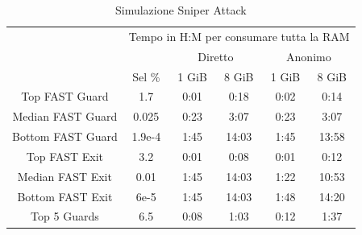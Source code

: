 \begin{table}[]
\centering
\caption{Simulazione Sniper Attack}
\label{Tab:sniperattack}
\begin{tabular}{cccccc}
\multicolumn{1}{l}{}                    & \multicolumn{5}{c}{Tempo in H:M per consumare tutta la RAM}                                                                                       \\ \cline{3-6} 
                                        & \multicolumn{1}{c|}{}       & \multicolumn{2}{c|}{Diretto}                              & \multicolumn{2}{c|}{Anonimo}                           \\ \cline{2-6} 
\multicolumn{1}{c|}{}                   & \multicolumn{1}{c|}{Sel \%} & \multicolumn{1}{c|}{1 GiB} & \multicolumn{1}{c|}{8 GiB}  & \multicolumn{1}{c|}{1 GiB} & \multicolumn{1}{c|}{8 GiB}  \\ \hline
\multicolumn{1}{|c|}{Top {\ttfamily FAST} Guard}    & \multicolumn{1}{c|}{1.7}    & \multicolumn{1}{c|}{0:01}  & \multicolumn{1}{c|}{0:18}   & \multicolumn{1}{c|}{0:02}  & \multicolumn{1}{c|}{0:14}   \\
\multicolumn{1}{|c|}{Median {\ttfamily FAST} Guard} & \multicolumn{1}{c|}{0.025}  & \multicolumn{1}{c|}{0:23}  & \multicolumn{1}{c|}{3:07}   & \multicolumn{1}{c|}{0:23}  & \multicolumn{1}{c|}{3:07}   \\
\multicolumn{1}{|c|}{Bottom {\ttfamily FAST} Guard} & \multicolumn{1}{c|}{1.9e-4} & \multicolumn{1}{c|}{1:45}  & \multicolumn{1}{c|}{14:03}  & \multicolumn{1}{c|}{1:45}  & \multicolumn{1}{c|}{13:58}  \\ \hline
\multicolumn{1}{|c|}{Top {\ttfamily FAST} Exit}     & \multicolumn{1}{c|}{3.2}    & \multicolumn{1}{c|}{0:01}  & \multicolumn{1}{c|}{0:08}   & \multicolumn{1}{c|}{0:01}  & \multicolumn{1}{c|}{0:12}   \\
\multicolumn{1}{|c|}{Median {\ttfamily FAST} Exit}  & \multicolumn{1}{c|}{0.01}   & \multicolumn{1}{c|}{1:45}  & \multicolumn{1}{c|}{14:03}  & \multicolumn{1}{c|}{1:22}  & \multicolumn{1}{c|}{10:53}  \\
\multicolumn{1}{|c|}{Bottom {\ttfamily FAST} Exit}  & \multicolumn{1}{c|}{6e-5}   & \multicolumn{1}{c|}{1:45}  & \multicolumn{1}{c|}{14:03}  & \multicolumn{1}{c|}{1:48}  & \multicolumn{1}{c|}{14:20}  \\ \hline
\multicolumn{1}{|c|}{Top 5 Guards}      & \multicolumn{1}{c|}{6.5}    & \multicolumn{1}{c|}{0:08}  & \multicolumn{1}{c|}{1:03}   & \multicolumn{1}{c|}{0:12}  & \multicolumn{1}{c|}{1:37}   \\

\end{tabular}
\end{table}
